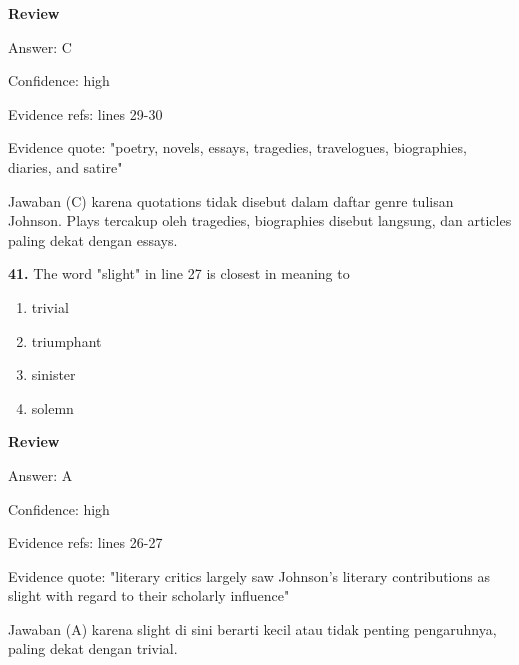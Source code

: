 \documentclass[12pt]{article}
\begin{document}
\par
\begingroup
\setlength{\parskip}{0pt}
\setlength{\parindent}{0pt}
\textbf{Review}\par
Answer: C\par
Confidence: high\par
Evidence refs: lines 29-30\par
Evidence quote: "poetry, novels, essays, tragedies, travelogues, biographies, diaries, and satire"\par
Jawaban (C) karena quotations tidak disebut dalam daftar genre tulisan Johnson. Plays tercakup oleh tragedies, biographies disebut langsung, dan articles paling dekat dengan essays.\par
\endgroup
\par
\vspace{0.25\baselineskip}
\noindent\textbf{41.} The word "slight" in line 27 is closest in meaning to
\begin{enumerate}[label=(\Alph*),leftmargin=*,itemsep=0.2em]
\item trivial
\item triumphant
\item sinister
\item solemn
\end{enumerate}
\par
\begingroup
\setlength{\parskip}{0pt}
\setlength{\parindent}{0pt}
\textbf{Review}\par
Answer: A\par
Confidence: high\par
Evidence refs: lines 26-27\par
Evidence quote: "literary critics largely saw Johnson's literary contributions as slight with regard to their scholarly influence"\par
Jawaban (A) karena slight di sini berarti kecil atau tidak penting pengaruhnya, paling dekat dengan trivial.\par
\endgroup
\par
\vspace{0.25\baselineskip}
\end{document}
